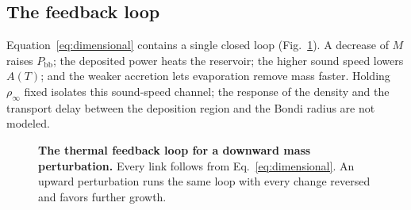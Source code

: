 \documentclass[11pt,a4paper]{article}
\newcommand{\Pbb}{P_{\mathrm{bb}}}
\begin{document}
\subsection{The feedback loop}
Equation~\eqref{eq:dimensional} contains a single closed loop (Fig.~\ref{fig:loop}). A decrease of $M$ raises $\Pbb$; the deposited power heats the reservoir; the higher sound speed lowers $A(T)$; and the weaker accretion lets evaporation remove mass faster. Holding $\rho_\infty$ fixed isolates this sound-speed channel; the response of the density and the transport delay between the deposition region and the Bondi radius are not modeled.

\begin{figure}[tbp]
\centering
{}
\caption{\textbf{The thermal feedback loop for a downward mass perturbation.} Every link follows from Eq.~\eqref{eq:dimensional}. An upward perturbation runs the same loop with every change reversed and favors further growth.}
\label{fig:loop}
\end{figure}
\end{document}
